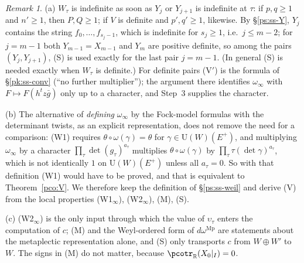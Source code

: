 \documentclass[10pt]{amsart}
\theoremstyle{definition}
\theoremstyle{remark}
\newtheorem{remark}[theorem]{Remark}
\newcommand{\C}{\mathbb C}
\newcommand{\R}{\mathbb R}
\providecommand{\auNm}{\operatorname{Nm}}
\providecommand{\auO}{\mathcal O}
\providecommand{\auPa}{\Phi_a}
\providecommand{\auPl}{\Phi}
\providecommand{\auS}{\mathcal S}
\providecommand{\auSram}{\mathcal S^{\mathrm{ram}}}
\providecommand{\auU}{\mathrm U}
\providecommand{\aubar}[1]{\overline{#1}}
\providecommand{\auerr}{\operatorname{err}}
\providecommand{\augain}{\operatorname{gain}}
\begin{document}
\begin{remark}\label{pco:rem-V}
(a) $W_\tau$ is indefinite as soon as $Y_j$ or $Y_{j+1}$ is indefinite at $\tau$: if
$p,q\ge1$ and $n'\ge1$, then $P,Q\ge1$; if $V$ is definite and $p',q'\ge1$, likewise. By
\S\ref{ps:ss-Y}, $Y_j$ contains the string $f_0,\dots,f_{s_j-1}$, which is indefinite for
$s_j\ge1$, i.e.\ $j\le m-2$; for $j=m-1$ both $Y_{m-1}=X_{m-1}$ and $Y_m$ are positive definite, so
among the pairs $(Y_j,Y_{j+1})$, (S) is used exactly for the last pair $j=m-1$. (In general (S) is
needed exactly when $W_\tau$ is definite.)
For definite pairs (V$'$) is the formula of \S\ref{pk:ss-conv} (``no further multiplier''); the
argument there identifies $\omega_\infty$ with $F\mapsto F(h^tz\bar g)$ only up to a character,
and Step~3 supplies the character.

(b) The alternative of \emph{defining} $\omega_\infty$ by the Fock-model formulas with the
determinant twists, as an explicit representation, does not remove the need for a comparison:
(W1) requires $\theta\circ\omega(\gamma)=\theta$ for $\gamma\in\auU(W)(E^+)$, and multiplying
$\omega_\infty$ by a character $\prod_\tau\det(g_\tau)^{a_\tau}$ multiplies $\theta\circ\omega(\gamma)$
by $\prod_\tau\tau(\det\gamma)^{a_\tau}$, which is not identically $1$ on $\auU(W)(E^+)$ unless all
$a_\tau=0$. So with that definition (W1) would have to be proved, and that is equivalent to
Theorem~\ref{pco:V}. We therefore keep the definition of \S\ref{ps:ss-weil} and derive (V) from
the local properties (W1$_\infty$), (W2$_\infty$), (M), (S).

(c) (W2$_\infty$) is the only input through which the value of $\upsilon_\tau$ enters the
computation of $c$; (M) and the Weyl-ordered form of $d\omega^{\mathrm{Mp}}$ are statements about the
metaplectic representation alone, and (S) only transports $c$ from $W\oplus W'$ to $W$. The signs
in (M) do not matter, because $\pcotr_\R(X_0|_I)=0$.
\end{remark}



\providecommand{\auO}{\mathcal O}
\providecommand{\auPl}{\Phi}
\providecommand{\auPa}{\Phi_a}
\providecommand{\auPb}{\Phi_b}
\providecommand{\auS}{\mathcal S}
\providecommand{\auSram}{\mathcal S^{\mathrm{ram}}}
\providecommand{\auDX}{D_X}
\providecommand{\augain}{\operatorname{gain}}
\providecommand{\auerr}{\operatorname{err}}
\providecommand{\auNm}{\operatorname{Nm}}
\providecommand{\auU}{\mathrm U}
\providecommand{\auGL}{\mathrm{GL}}
\providecommand{\auA}{\mathbb A}
\providecommand{\auF}{\mathbb F}
\providecommand{\aucol}{\operatorname{col}}
\providecommand{\aubar}[1]{\overline{#1}}
\providecommand{\auf}[1]{\texttt{#1}}
\providecommand{\pao}{\mathfrak o}
\providecommand{\pam}{\mathfrak m}
\providecommand{\paCp}{\C_p}
\providecommand{\paI}{I_p^{\circ}}
\providecommand{\pavp}{\varpi}
\providecommand{\paded}{\operatorname{ded}}
\providecommand{\paPred}{\operatorname{Pred}}
\providecommand{\paloss}{\operatorname{loss}}
\providecommand{\panot}[1]{\par\smallskip{\raggedright\noindent\textbf{[Not proved here:} #1\textbf{]}\par}\smallskip}
\end{document}
